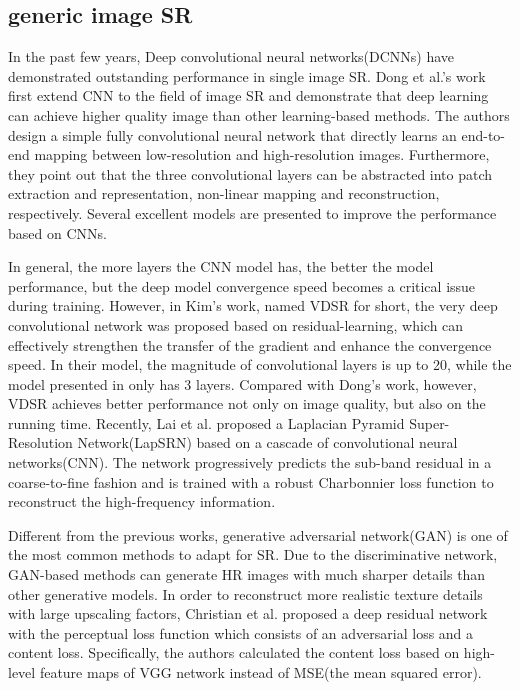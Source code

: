 \documentclass[conference,compsoc]{IEEEtran}
\begin{document}
\subsection{generic image SR}
In the past few years, Deep convolutional neural networks(DCNNs) have demonstrated outstanding performance in single image SR. Dong et al.'s work\cite{Dong-He-PAMI2016Image} first extend CNN to the field of image SR and demonstrate that deep learning can achieve higher quality image than other learning-based methods. The authors design a simple fully convolutional neural network that directly learns an end-to-end mapping between low-resolution and high-resolution images. Furthermore, they point out that the three convolutional layers can be abstracted into patch extraction and representation, non-linear mapping and reconstruction, respectively. Several excellent models\cite{dong2016accelerating, Kim_2016_DRCN, LapSRN_CVPR2017} are presented to improve the performance based on CNNs.

In general, the more layers the CNN model has, the better the model performance, but the deep model convergence speed becomes a critical issue during training. However, in Kim's work\cite{Kim_2016_DRCN}, named VDSR for short, the very deep convolutional network was proposed based on residual-learning\cite{He2015Deep}, which can effectively strengthen the transfer of the gradient and enhance the convergence speed. In their model, the magnitude of convolutional layers is up to 20, while the model presented in \cite{Dong-He-PAMI2016Image} only has 3 layers. Compared with Dong's work\cite{Dong-He-PAMI2016Image}, however, VDSR achieves better performance not only on image quality, but also on the running time. Recently, Lai et al.\cite{LapSRN_CVPR2017} proposed a Laplacian Pyramid Super-Resolution Network(LapSRN) based on a cascade of convolutional neural networks(CNN). The network progressively predicts the sub-band residual in a coarse-to-fine fashion and is trained with a robust Charbonnier loss function to reconstruct the high-frequency information.

Different from the previous works, generative adversarial network(GAN) is one of the most common methods\cite{David-BEGAN2017, Christian-SRGAN-CVPR2017, Yu-URGAN-ECCV2016, Goodfellow2014GAN} to adapt for SR. Due to the discriminative network, GAN-based methods can generate HR images with much sharper details than other generative models\cite{kingma2013auto, denton2015deep}. In order to reconstruct more realistic texture details with large upscaling factors, Christian et al.\cite{Christian-SRGAN-CVPR2017} proposed a deep residual network with the perceptual loss function which consists of an adversarial loss and a content loss. Specifically, the authors calculated the content loss based on high-level feature maps of VGG network\cite{Simonyan2015Very} instead of MSE(the mean squared error).
\end{document}
